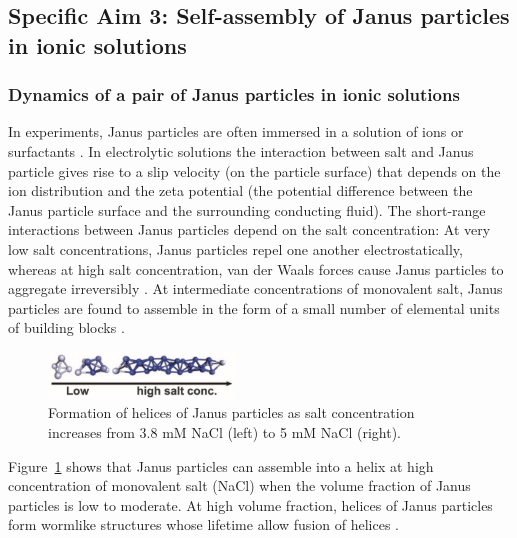 \subsection{Specific Aim 3: Self-assembly of Janus particles in ionic solutions}
\label{subsec:specific_aim_3}

\subsubsection{Dynamics of a pair of Janus particles in ionic solutions\label{subsubsec:JP_electrolyte}}
In experiments, Janus particles are often immersed in a solution of ions \cite{Chen2011_Science} or surfactants \cite{Goodwin2009}.
In electrolytic solutions the interaction between salt and Janus particle gives 
rise to a slip velocity (on the particle surface) that depends on the ion distribution and the zeta potential \cite{BayatiNajafi2016_JCP} 
(the potential difference between the Janus particle surface and the surrounding conducting fluid).
The short-range interactions between Janus particles depend on the salt concentration:
At very low salt concentrations, Janus particles repel one another electrostatically, whereas at high salt concentration, van der Waals
forces cause Janus particles to aggregate irreversibly \cite{Goodwin2009}. At intermediate concentrations of monovalent salt, Janus particles are found to assemble in the form of a small number of elemental units of building blocks \cite{Chen2011_Science}. 
%
\begin{figure}
  \vspace{-5pt}
\centerline{\includegraphics[width=0.44\textwidth]{Figures/fig2A_Chen2011_Science}}
  \vspace{-5pt}
\caption{\label{fig:helices_of_JPs} \footnotesize Formation of helices of Janus particles as salt concentration increases from 3.8 mM NaCl  (left) to 5 mM NaCl (right)\cite{Chen2011_Science}.}
\end{figure}
%
Figure~\ref{fig:helices_of_JPs} shows that Janus particles can assemble into a helix at high concentration of monovalent salt (NaCl) when the volume fraction of Janus particles is low to moderate. At high volume fraction, helices of Janus particles form wormlike structures whose lifetime allow fusion of helices \cite{Chen2011_Science}. 

